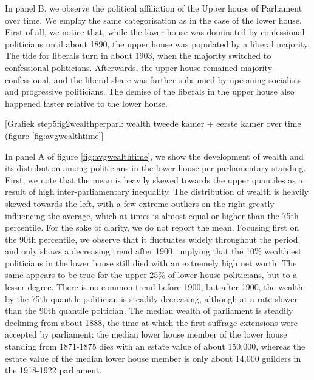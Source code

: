     In panel B, we observe the political affiliation of the Upper house of Parliament over time. We employ the same categorisation as in the case of the lower house. First of all, we notice that, while the lower house was dominated by confessional politicians until about 1890, the upper house was populated by a liberal majority. The tide for liberals turn in about 1903, when the majority switched to confessional politicians. Afterwards, the upper house remained majority-confessional, and the liberal share was further subsumed by upcoming socialists and progressive politicians. The demise of the liberals in the upper house also happened faster relative to the lower house. 
    
\begin{center}    
    [Grafiek step5fig2wealthperparl: wealth tweede kamer + eerste kamer over time (figure \ref{fig:avgwealthtime}]
 \end{center}
 
    In panel A of figure \ref{fig:avgwealthtime}, we show the development of wealth and its distribution among politicians in the lower house per parliamentary standing. First, we note that the mean is heavily skewed towards the upper quantiles as a result of high inter-parliamentary inequality. The distribution of wealth is heavily skewed towards the left, with a few extreme outliers on the right greatly influencing the average, which at times is almost equal or higher than the 75th percentile. For the sake of clarity, we do not report the mean. Focusing first on the 90th percentile, we observe that it fluctuates widely throughout the period, and only shows a decreasing trend after 1900, implying that the 10\% wealthiest politicians in the lower house still died with an extremely high net worth. The same appears to be true for the upper 25\% of lower house politicians, but to a lesser degree. There is no common trend before 1900, but after 1900, the wealth by the 75th quantile politician is steadily decreasing, although at a rate slower than the 90th quantile poltician.  The median wealth of parliament is steadily declining from about 1888, the time at which the first suffrage extensions were accepted by parliament: the median lower house member of the lower house standing from 1871-1875 dies with an estate value of about 150,000, whereas the estate value of the median lower house member is only about 14,000 guilders in the 1918-1922 parliament.
    
